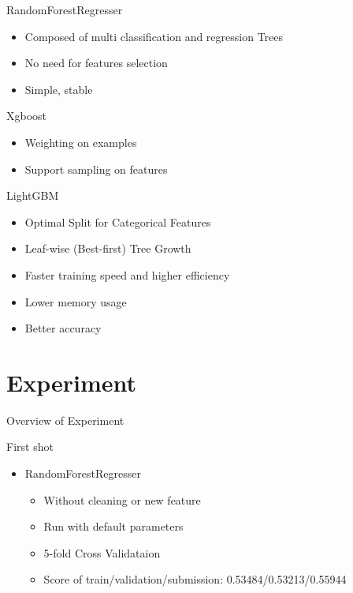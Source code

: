 \documentclass[
 size=12pt,
 paper=smartboard, %
 mode=present, %
 display=slides, %
style=tuliplab,
pauseslide,
fleqn,leqno]{powerdot}
\begin{document}
\begin{slide}{RandomForestRegresser}
  \begin{itemize}
    \item Composed of multi classification and regression Trees \pause
    \item No need for features selection \pause
    \item Simple, stable
  \end{itemize}
\end{slide}

\begin{slide}{Xgboost}
  \begin{itemize}
    \item Weighting on examples
    \item Support sampling on features \pause
  \end{itemize}
\end{slide}

\begin{slide}{LightGBM}
  \begin{itemize}
    \item Optimal Split for Categorical Features \pause
    \item Leaf-wise (Best-first) Tree Growth \pause
    \item Faster training speed and higher efficiency \pause
    \item Lower memory usage \pause
    \item Better accuracy \pause
  \end{itemize}
\end{slide}


\section{Experiment}

\begin{slide}[toc=,bm=]{Overview of Experiment}
  \tableofcontents[content=currentsection,type=0]
\end{slide}

\begin{slide}{First shot}
  \begin{itemize}
    \item RandomForestRegresser
    \begin{itemize}
      \item Without cleaning or new feature
      \item Run with default parameters
      \item 5-fold Cross Validataion
      \item Score of train/validation/submission: 0.53484/0.53213/0.55944
    \end{itemize}
  \end{itemize}
\end{slide}
\end{document}
